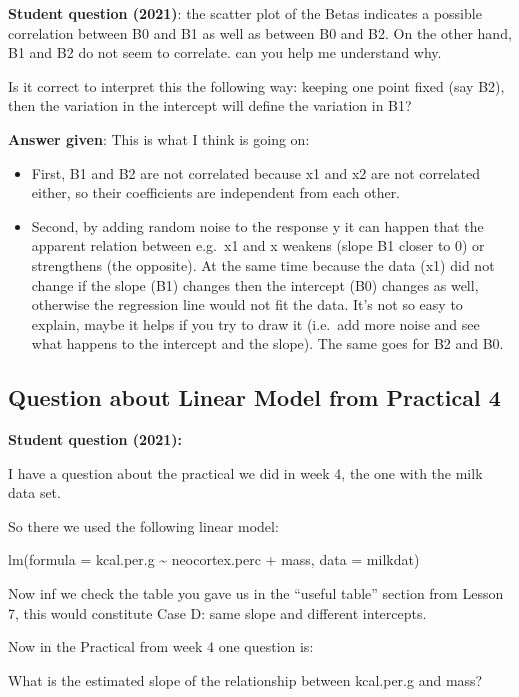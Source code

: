 \documentclass[
  letterpaper,
  8pt,
  a4paper]{book}
\providecommand{\tightlist}{%
  \setlength{\itemsep}{0pt}\setlength{\parskip}{0pt}}
\begin{document}
\textbf{Student question (2021)}: the scatter plot of the Betas
indicates a possible correlation between B0 and B1 as well as between B0
and B2. On the other hand, B1 and B2 do not seem to correlate. can you
help me understand why.

Is it correct to interpret this the following way: keeping one point
fixed (say B2), then the variation in the intercept will define the
variation in B1?

\textbf{Answer given}: This is what I think is going on:

\begin{itemize}
\tightlist
\item
  First, B1 and B2 are not correlated because x1 and x2 are not
  correlated either, so their coefficients are independent from each
  other.
\item
  Second, by adding random noise to the response y it can happen that
  the apparent relation between e.g.~x1 and x weakens (slope B1 closer
  to 0) or strengthens (the opposite). At the same time because the data
  (x1) did not change if the slope (B1) changes then the intercept (B0)
  changes as well, otherwise the regression line would not fit the data.
  It's not so easy to explain, maybe it helps if you try to draw it
  (i.e.~add more noise and see what happens to the intercept and the
  slope). The same goes for B2 and B0.
\end{itemize}

\subsection*{Question about Linear Model from Practical
4}\label{question-about-linear-model-from-practical-4}

\textbf{Student question (2021):}

I have a question about the practical we did in week 4, the one with the
milk data set.

So there we used the following linear model:

lm(formula = kcal.per.g \textasciitilde{} neocortex.perc + mass, data =
milkdat)

Now inf we check the table you gave us in the ``useful table'' section
from Lesson 7, this would constitute Case D: same slope and different
intercepts.

Now in the Practical from week 4 one question is:

What is the estimated slope of the relationship between kcal.per.g and
mass?
\end{document}
